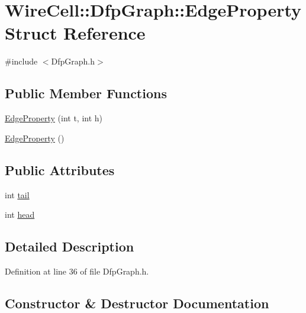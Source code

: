 \hypertarget{struct_wire_cell_1_1_dfp_graph_1_1_edge_property}{}\section{Wire\+Cell\+:\+:Dfp\+Graph\+:\+:Edge\+Property Struct Reference}
\label{struct_wire_cell_1_1_dfp_graph_1_1_edge_property}


{\ttfamily \#include $<$Dfp\+Graph.\+h$>$}

\subsection*{Public Member Functions}
\begin{DoxyCompactItemize}
\item 
\hyperlink{struct_wire_cell_1_1_dfp_graph_1_1_edge_property_aebd0e30970b05471a56249053e593c65}{Edge\+Property} (int t, int h)
\item 
\hyperlink{struct_wire_cell_1_1_dfp_graph_1_1_edge_property_ab9a099400cf4ae79f76309b87ee919e0}{Edge\+Property} ()
\end{DoxyCompactItemize}
\subsection*{Public Attributes}
\begin{DoxyCompactItemize}
\item 
int \hyperlink{struct_wire_cell_1_1_dfp_graph_1_1_edge_property_abdc33a0dad8cc99591a0b257836c5258}{tail}
\item 
int \hyperlink{struct_wire_cell_1_1_dfp_graph_1_1_edge_property_a159b254ccbf3bd852eb6d44571b67228}{head}
\end{DoxyCompactItemize}


\subsection{Detailed Description}


Definition at line 36 of file Dfp\+Graph.\+h.



\subsection{Constructor \& Destructor Documentation}
\mbox{\label{struct_wire_cell_1_1_dfp_graph_1_1_edge_property_aebd0e30970b05471a56249053e593c65}} 

